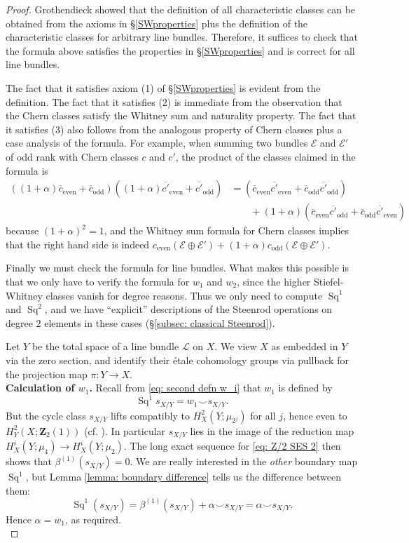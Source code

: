 \documentclass[10pt, reqno]{amsart}
\numberwithin{equation}{subsection}
\newcommand{\Z}{\mathbf{Z}}
\newcommand{\ol}[1]{\overline{#1}}
\newcommand{\Cal}[1]{\mathcal{#1}}
\newcommand{\co}{\colon}
\DeclareMathOperator{\Sq}{Sq}
\DeclareMathOperator{\odd}{odd}
\DeclareMathOperator{\even}{even}
\theoremstyle{remark}
\begin{document}
\begin{proof}
Grothendieck showed \cite{Gro58} that the definition of all characteristic classes can be obtained from the axioms in \S \ref{SWproperties} plus the definition of the characteristic classes for arbitrary line bundles. Therefore, it suffices to check that the formula above satisfies the properties in \S \ref{SWproperties} and is correct for all line bundles. 

The fact that it satisfies axiom (1) of \S \ref{SWproperties} is evident from the definition. The fact that it satisfies (2) is immediate from the observation that the Chern classes satisfy the Whitney sum and naturality property. The fact that it satisfies (3) also follows from the analogous property of Chern classes plus a case analysis of the formula. For example, when summing two bundles $\Cal{E}$ and $\Cal{E}'$ of odd rank with Chern classes $c$ and $c'$, the product of the classes claimed in the formula is 
\begin{align*}
((1+\alpha)\ol{c}_{\even} + \ol{c}_{\odd}) ((1+\alpha)\ol{c'}_{\even}+ \ol{c'}_{\odd}) &= (\ol{c}_{\even} \ol{c'}_{\even} + \ol{c}_{\odd}  \ol{c'}_{\odd} ) \\
& \qquad  + (1+\alpha) (\ol{c}_{\even} \ol{c'}_{\odd} + \ol{c}_{\odd} \ol{c'}_{\even})
\end{align*}
because $(1+\alpha)^2 = 1$, and the Whitney sum formula for Chern classes implies that the right hand side is indeed $c_{\even}(\Cal{E} \oplus \Cal{E}') + (1+\alpha) c_{\odd}(\Cal{E} \oplus \Cal{E}') $.

Finally we must check the formula for line bundles. What makes this possible is that we only have to verify the formula for $w_1$ and $w_2$, since the higher Stiefel-Whitney classes vanish for degree reasons. Thus we only need to compute $\Sq^1$ and $\Sq^2$, and we have ``explicit'' descriptions of the Steenrod operations on degree $2$ elements in these cases (\S \ref{subsec: classical Steenrod}).

Let $Y$ be the total space of a line bundle $\Cal{L}$ on $X$. We view $X$ as embedded in $Y$ via the zero section, and identify their \'{e}tale cohomology groups via pullback for the projection map $\pi \co Y \rightarrow X$. \\

\noindent \textbf{Calculation of $w_1$.} Recall from \eqref{eq: second defn w_i} that $w_1$ is defined by
\[
\Sq^1 s_{X/Y} = w_1 \smile s_{X/Y}.
\]
But the cycle class $s_{X/Y}$ lifts compatibly to $H_X^{2}(Y; \mu_{2^j})$ for all $j$, hence even to $H_Y^{2}(X; \Z_{2}(1))$ (cf. \cite[\S II.2]{FK88}). In particular $s_{X/Y}$ lies in the image of the reduction map $H^i_X(Y; \mu_4 ) \rightarrow H^i_X(Y; \mu_2)$.  The long exact sequence for \eqref{eq: Z/2 SES 2} then shows that $\beta^{(1)}(s_{X/Y}) = 0$. We are really interested in the \emph{other} boundary map $\Sq^1$, but Lemma \ref{lemma: boundary difference} tells us the difference between them:
\[
\Sq^1 (s_{X/Y})= \beta^{(1)} (s_{X/Y} )+ \alpha \smile s_{X/Y} = \alpha \smile s_{X/Y}.
\]
Hence $\alpha = w_1$, as required. \\


\end{proof}
\end{document}
